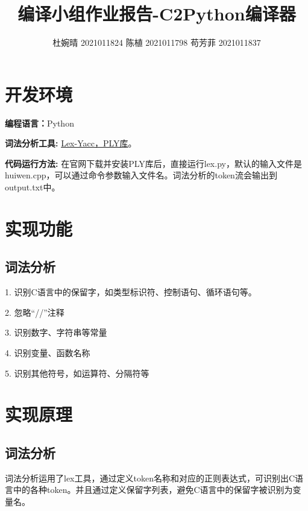 \documentclass{article}
\begin{document}
\title{\textbf{编译小组作业报告-C2Python编译器}}
\author{杜婉晴 2021011824 陈植 2021011798 苟芳菲 2021011837}
\maketitle \thispagestyle{empty}
\section{开发环境}

\textbf{编程语言：}Python

\textbf{词法分析工具: }
\href{https://tastones.com/stackoverflow/python-language/python-lex-yacc/getting_started_with_ply/}{Lex-Yacc，PLY库}。

\textbf{代码运行方法: }在官网下载并安装PLY库后，直接运行lex.py，默认的输入文件是huiwen.cpp，可以通过命令参数输入文件名。词法分析的token流会输出到output.txt中。

\section{实现功能}
\subsection{词法分析}
1. 识别C语言中的保留字，如类型标识符、控制语句、循环语句等。

2. 忽略“//”注释

3. 识别数字、字符串等常量

4. 识别变量、函数名称

5. 识别其他符号，如运算符、分隔符等

\section{实现原理}
\subsection{词法分析}
词法分析运用了lex工具，通过定义token名称和对应的正则表达式，可识别出C语言中的各种token。并且通过定义保留字列表，避免C语言中的保留字被识别为变量名。
\end{document}
